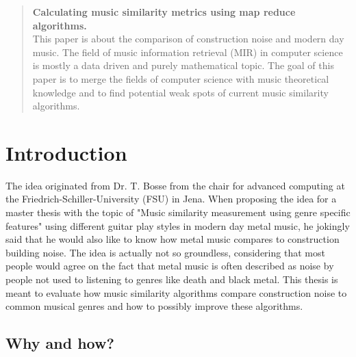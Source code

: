 \begin{abstract}

	\textbf{Calculating music similarity metrics using map reduce algorithms.}\\
	This paper is about the comparison of construction noise and modern day music. 
	The field of music information retrieval (MIR) in computer science is mostly a data driven and purely mathematical topic. The goal of this paper is to merge the fields of computer science with music theoretical knowledge and to find potential weak spots of current music similarity algorithms. 

\end{abstract}


\mainmatter %

\chapter{Introduction}

The idea originated from Dr. T. Bosse from the chair for advanced computing at the Friedrich-Schiller-University (FSU) in Jena. When proposing the idea for a master thesis with the topic of "Music similarity measurement using genre specific features" using different guitar play styles in modern day metal music, he jokingly said that he would also like to know how metal music compares to construction building noise.
The idea is actually not so groundless, considering that most people would agree on the fact that metal music is often described as noise by people not used to listening to genres like death and black metal.
This thesis is meant to evaluate how music similarity algorithms compare construction noise to common musical genres and how to possibly improve these algorithms.

\section{Why and how?}

